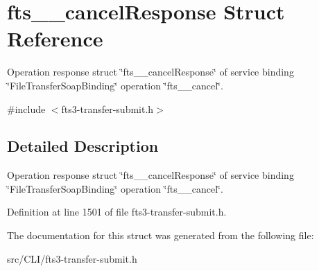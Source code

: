 \section{fts\_\-\_\-cancelResponse Struct Reference}
\label{structfts____cancelResponse}


Operation response struct \char`\"{}fts\_\-\_\-cancelResponse\char`\"{} of service binding \char`\"{}FileTransferSoapBinding\char`\"{} operation \char`\"{}fts\_\-\_\-cancel\char`\"{}.  




{\ttfamily \#include $<$fts3-\/transfer-\/submit.h$>$}



\subsection{Detailed Description}
Operation response struct \char`\"{}fts\_\-\_\-cancelResponse\char`\"{} of service binding \char`\"{}FileTransferSoapBinding\char`\"{} operation \char`\"{}fts\_\-\_\-cancel\char`\"{}. 

Definition at line 1501 of file fts3-\/transfer-\/submit.h.



The documentation for this struct was generated from the following file:\begin{DoxyCompactItemize}
\item 
src/CLI/fts3-\/transfer-\/submit.h\end{DoxyCompactItemize}
